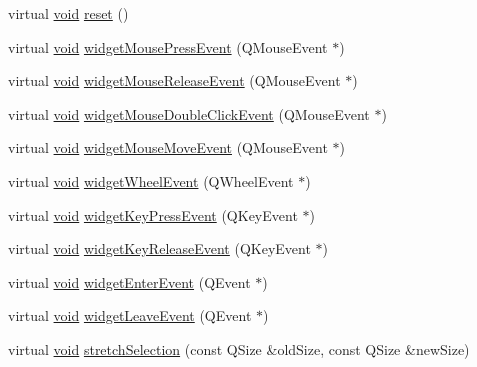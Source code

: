 \begin{DoxyCompactItemize}
virtual \hyperlink{group___u_a_v_objects_plugin_ga444cf2ff3f0ecbe028adce838d373f5c}{void} \hyperlink{class_qwt_picker_a0e50f7be7182e81607bf1625dcdff6eb}{reset} ()
\item 
virtual \hyperlink{group___u_a_v_objects_plugin_ga444cf2ff3f0ecbe028adce838d373f5c}{void} \hyperlink{class_qwt_picker_a4bfae8da37c3936ae73d4798cca4a3d9}{widget\-Mouse\-Press\-Event} (Q\-Mouse\-Event $\ast$)
\item 
virtual \hyperlink{group___u_a_v_objects_plugin_ga444cf2ff3f0ecbe028adce838d373f5c}{void} \hyperlink{class_qwt_picker_ac009633e005b6290e07b902f2a58e45e}{widget\-Mouse\-Release\-Event} (Q\-Mouse\-Event $\ast$)
\item 
virtual \hyperlink{group___u_a_v_objects_plugin_ga444cf2ff3f0ecbe028adce838d373f5c}{void} \hyperlink{class_qwt_picker_af1ffb07c24be57cd4a753b04412b3212}{widget\-Mouse\-Double\-Click\-Event} (Q\-Mouse\-Event $\ast$)
\item 
virtual \hyperlink{group___u_a_v_objects_plugin_ga444cf2ff3f0ecbe028adce838d373f5c}{void} \hyperlink{class_qwt_picker_a88b203109a4d3b26c2e0bee110c56c9d}{widget\-Mouse\-Move\-Event} (Q\-Mouse\-Event $\ast$)
\item 
virtual \hyperlink{group___u_a_v_objects_plugin_ga444cf2ff3f0ecbe028adce838d373f5c}{void} \hyperlink{class_qwt_picker_af92ffabe291a6254378dc932c5cce0a7}{widget\-Wheel\-Event} (Q\-Wheel\-Event $\ast$)
\item 
virtual \hyperlink{group___u_a_v_objects_plugin_ga444cf2ff3f0ecbe028adce838d373f5c}{void} \hyperlink{class_qwt_picker_af5bc441b2fc143363563922a3b3c70ae}{widget\-Key\-Press\-Event} (Q\-Key\-Event $\ast$)
\item 
virtual \hyperlink{group___u_a_v_objects_plugin_ga444cf2ff3f0ecbe028adce838d373f5c}{void} \hyperlink{class_qwt_picker_a9f2c739a619be794b22a10ede9674a1e}{widget\-Key\-Release\-Event} (Q\-Key\-Event $\ast$)
\item 
virtual \hyperlink{group___u_a_v_objects_plugin_ga444cf2ff3f0ecbe028adce838d373f5c}{void} \hyperlink{class_qwt_picker_a7d3d1b97aba53a7f917013e111a5a636}{widget\-Enter\-Event} (Q\-Event $\ast$)
\item 
virtual \hyperlink{group___u_a_v_objects_plugin_ga444cf2ff3f0ecbe028adce838d373f5c}{void} \hyperlink{class_qwt_picker_a8a2a18f2b98c8524b1d3684df44c24aa}{widget\-Leave\-Event} (Q\-Event $\ast$)
\item 
virtual \hyperlink{group___u_a_v_objects_plugin_ga444cf2ff3f0ecbe028adce838d373f5c}{void} \hyperlink{class_qwt_picker_a24b0e4bcf6a9b7f41c81ea19305105a8}{stretch\-Selection} (const Q\-Size \&old\-Size, const Q\-Size \&new\-Size)

\end{DoxyCompactItemize}
